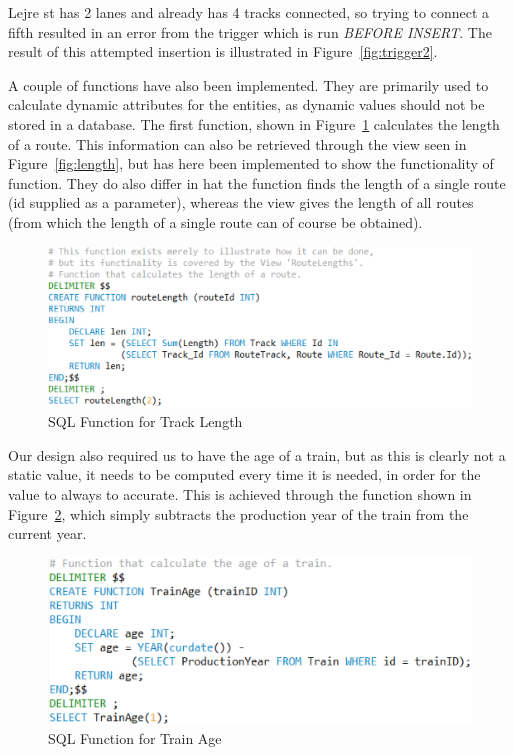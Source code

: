 Lejre st has 2 lanes and already has 4 tracks connected, so trying to connect a 
fifth resulted in an error from the trigger which is run \emph{BEFORE INSERT}. 
The result of this attempted insertion is illustrated in 
Figure~\ref{fig:trigger2}.

A couple of functions have also been implemented. They are primarily used to 
calculate dynamic attributes for the entities, as dynamic values should not be 
stored in a database. The first function, shown in Figure~\ref{fig:func:length} 
calculates the length of a route. This information can also be retrieved 
through the view seen in Figure~\ref{fig:length}, but has here been implemented 
to show the functionality of function. They do also differ in hat the function 
finds the length of a single route (id supplied as a parameter), whereas the 
view gives the length of all routes (from which the length of a single route 
can of course be obtained).

\begin{figure}[h]
    \centering
    \includegraphics[scale=.75]{img/SQL_FUNCTION_Length}
    \caption{SQL Function for Track Length}
    \label{fig:func:length}
\end{figure}

Our design also required us to have the age of a train, but as this is clearly 
not a static value, it needs to be computed every time it is needed, in order 
for the value to always to accurate. This is achieved through the function 
shown in Figure~\ref{fig:age}, which simply subtracts the production year of 
the train from the current year. 

\begin{figure}[h]
    \centering
    \includegraphics[scale=.75]{img/SQL_FUNCTION_Age}
    \caption{SQL Function for Train Age}
    \label{fig:age}
\end{figure}

